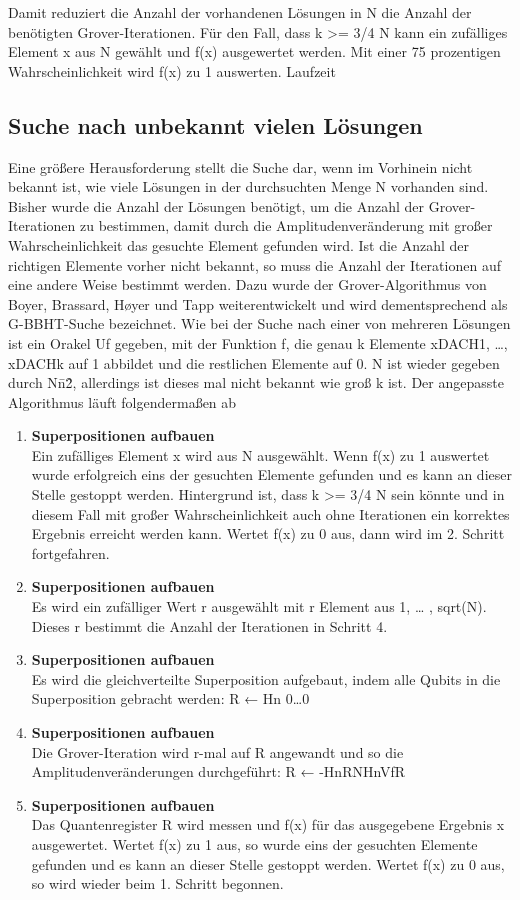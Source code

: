 Damit reduziert die Anzahl der vorhandenen Lösungen in N die Anzahl der benötigten Grover-Iterationen. Für den Fall, dass k >= 3/4 N kann ein zufälliges Element x aus N gewählt und f(x) ausgewertet werden. Mit einer 75 prozentigen Wahrscheinlichkeit wird f(x) zu 1 auswerten.
Laufzeit

\subsection{Suche nach unbekannt vielen Lösungen}
Eine größere Herausforderung stellt die Suche dar, wenn im Vorhinein nicht bekannt ist, wie viele Lösungen in der durchsuchten Menge N vorhanden sind. Bisher wurde die Anzahl der Lösungen benötigt, um die Anzahl der Grover-Iterationen zu bestimmen, damit durch die Amplitudenveränderung mit großer Wahrscheinlichkeit das gesuchte Element gefunden wird. Ist die Anzahl der richtigen Elemente vorher nicht bekannt, so muss die Anzahl der Iterationen auf eine andere Weise bestimmt werden. Dazu wurde der Grover-Algorithmus von Boyer, Brassard, Høyer und Tapp weiterentwickelt und wird dementsprechend als G-BBHT-Suche bezeichnet.
Wie bei der Suche nach einer von mehreren Lösungen ist ein Orakel Uf gegeben, mit der Funktion f, die genau k Elemente xDACH1, …, xDACHk auf 1 abbildet und die restlichen Elemente auf 0. N ist wieder gegeben durch N\=n\^2, allerdings ist dieses mal nicht bekannt wie groß k ist. Der angepasste Algorithmus läuft folgendermaßen ab\:
\begin{enumerate}
    \item \textbf{Superpositionen aufbauen}
    \\
    Ein zufälliges Element x wird aus N ausgewählt. Wenn f(x) zu 1 auswertet wurde erfolgreich eins der gesuchten Elemente gefunden und es kann an dieser Stelle gestoppt werden. Hintergrund ist, dass k >= 3/4 N sein könnte und in diesem Fall mit großer Wahrscheinlichkeit auch ohne Iterationen ein korrektes Ergebnis erreicht werden kann. Wertet f(x) zu 0 aus, dann wird im 2. Schritt fortgefahren.
    \item \textbf{Superpositionen aufbauen}
    \\
    Es wird ein zufälliger Wert r ausgewählt mit r Element aus 1, … , sqrt(N). Dieses r bestimmt die Anzahl der Iterationen in Schritt 4.
    \item \textbf{Superpositionen aufbauen}
    \\
    Es wird die gleichverteilte Superposition aufgebaut, indem alle Qubits in die Superposition gebracht werden:
R ← Hn 0…0
    \item \textbf{Superpositionen aufbauen}
    \\
    Die Grover-Iteration wird r-mal auf R angewandt und so die Amplitudenveränderungen durchgeführt:
R ← -HnRNHnVfR
    \item \textbf{Superpositionen aufbauen}
    \\
    Das Quantenregister R wird messen und f(x) für das ausgegebene Ergebnis x ausgewertet. Wertet f(x) zu 1 aus, so wurde eins der gesuchten Elemente gefunden und es kann an dieser Stelle gestoppt werden. Wertet f(x) zu 0 aus, so wird wieder beim 1. Schritt begonnen.
\end{enumerate}

